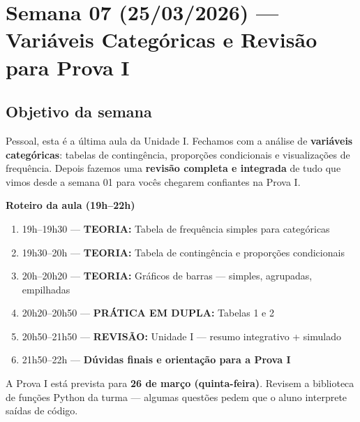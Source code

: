 
\chapter{Semana 07 (25/03/2026) — Variáveis Categóricas e Revisão para Prova I}

\section{Objetivo da semana}

Pessoal, esta é a última aula da Unidade I. Fechamos com a análise de
\textbf{variáveis categóricas}: tabelas de contingência, proporções
condicionais e visualizações de frequência. Depois fazemos uma
\textbf{revisão completa e integrada} de tudo que vimos desde a semana 01
para vocês chegarem confiantes na Prova I.

\begin{BoardBox}
\textbf{Roteiro da aula (19h–22h)}
\begin{enumerate}
  \item 19h–19h30 — \textbf{TEORIA:} Tabela de frequência simples para categóricas
  \item 19h30–20h — \textbf{TEORIA:} Tabela de contingência e proporções condicionais
  \item 20h–20h20 — \textbf{TEORIA:} Gráficos de barras — simples, agrupadas, empilhadas
  \item 20h20–20h50 — \textbf{PRÁTICA EM DUPLA:} Tabelas 1 e 2
  \item 20h50–21h50 — \textbf{REVISÃO:} Unidade I — resumo integrativo + simulado
  \item 21h50–22h — \textbf{Dúvidas finais e orientação para a Prova I}
\end{enumerate}
\end{BoardBox}

\begin{NoteBox}
A Prova I está prevista para \textbf{26 de março (quinta-feira)}.
Revisem a biblioteca de funções Python da turma — algumas questões pedem
que o aluno interprete saídas de código.
\end{NoteBox}

